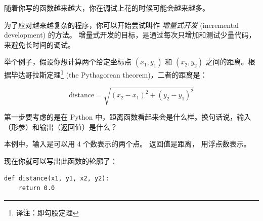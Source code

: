 
随着你写的函数越来越大，你在调试上花的时候可能会越来越多。


为了应对越来越复杂的程序，你可以开始尝试叫作 {\em 增量式开发} (incremental development) 的方法。 增量式开发的目标，是通过每次只增加和测试少量代码，来避免长时间的调试。
  


举个例子，假设你想计算两个给定坐标点 $(x_1, y_1)$ 和 $(x_2, y_2)$ 之间的距离。根据毕达哥拉斯定理\footnote{译注：即勾股定理} (the Pythagorean theorem)，二者的距离是：


\begin{displaymath}
\mathrm{distance} = \sqrt{(x_2 - x_1)^2 + (y_2 - y_1)^2}
\end{displaymath}

%

第一步要考虑的是在 Python 中，距离函数看起来会是什么样。换句话说，输入（形参）和输出（返回值）是什么？


本例中，输入是可以用 4 个数表示的两个点。 返回值是距离， 用浮点数表示。


现在你就可以写出此函数的轮廓了：

\begin{lstlisting}
def distance(x1, y1, x2, y2):
    return 0.0
\end{lstlisting}

%

